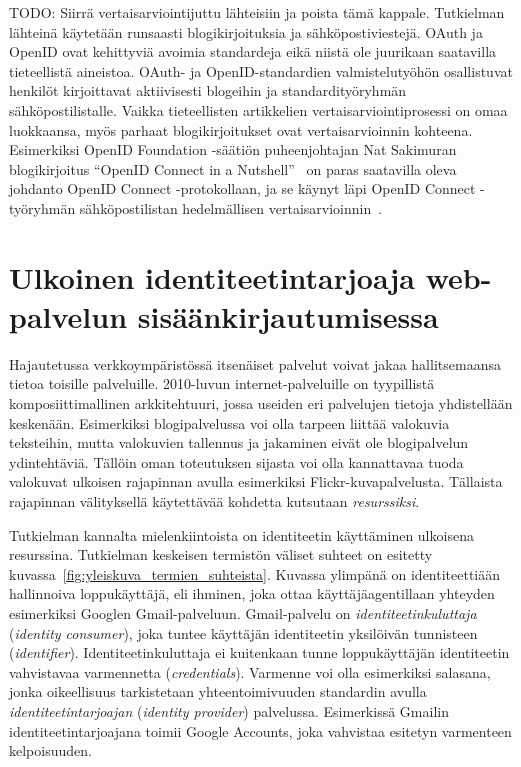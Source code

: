 \documentclass[finnish,gradu]{tktltiki}
\begin{document}
  TODO: Siirrä vertaisarviointijuttu lähteisiin ja poista tämä kappale.
  Tutkielman lähteinä käytetään runsaasti blogikirjoituksia ja sähköpostiviestejä. OAuth ja OpenID ovat kehittyviä avoimia standardeja eikä niistä ole juurikaan saatavilla tieteellistä aineistoa. OAuth- ja OpenID-standardien valmistelutyöhön osallistuvat henkilöt kirjoittavat aktiivisesti blogeihin ja standardityöryhmän sähköpostilistalle. Vaikka tieteellisten artikkelien vertaisarviointiprosessi on omaa luokkaansa, myös parhaat blogikirjoitukset ovat vertaisarvioinnin kohteena. Esimerkiksi OpenID Foundation -säätiön puheenjohtajan Nat Sakimuran blogikirjoitus ``OpenID Connect in a Nutshell''~\cite{sakimura_openid_c_nutshell_2012} on paras saatavilla oleva johdanto OpenID Connect -protokollaan, ja se käynyt läpi OpenID Connect -työryhmän sähköpostilistan hedelmällisen vertaisarvioinnin~\cite{openid_c_nutshell_peer_review_1_2012, openid_c_nutshell_peer_review_2_2012}.






\newpage
\section{Ulkoinen identiteetintarjoaja web-palvelun sisäänkirjautumisessa} %
\label{sec:kakkosluku}

  Hajautetussa verkkoympäristössä itsenäiset palvelut voivat jakaa hallitsemaansa tietoa toisille palveluille. 2010-luvun internet-palveluille on tyypillistä komposiittimallinen arkkitehtuuri, jossa useiden eri palvelujen tietoja yhdistellään keskenään. Esimerkiksi blogipalvelussa voi olla tarpeen liittää valokuvia teksteihin, mutta valokuvien tallennus ja jakaminen eivät ole blogipalvelun ydintehtäviä. Tällöin oman toteutuksen sijasta voi olla kannattavaa tuoda valokuvat ulkoisen rajapinnan avulla esimerkiksi Flickr-kuvapalvelusta. Tällaista rajapinnan välityksellä käytettävää kohdetta kutsutaan \emph{resurssiksi}.

  Tutkielman kannalta mielenkiintoista on identiteetin käyttäminen ulkoisena resurssina. Tutkielman keskeisen termistön väliset suhteet on esitetty kuvassa~\ref{fig:yleiskuva_termien_suhteista}. Kuvassa ylimpänä on identiteettiään hallinnoiva loppukäyttäjä, eli ihminen, joka ottaa käyttäjäagentillaan yhteyden esimerkiksi Googlen Gmail-palveluun. Gmail-palvelu on \emph{identiteetinkuluttaja} (\emph{identity consumer}), joka tuntee käyttäjän identiteetin yksilöivän tunnisteen (\emph{identifier}). Identiteetinkuluttaja ei kuitenkaan tunne loppukäyttäjän identiteetin vahvistavaa varmennetta (\emph{credentials}). Varmenne voi olla esimerkiksi salasana, jonka oikeellisuus tarkistetaan yhteentoimivuuden standardin avulla \emph{identiteetintarjoajan} (\emph{identity provider}) palvelussa. Esimerkissä Gmailin identiteetintarjoajana toimii Google Accounts, joka vahvistaa esitetyn varmenteen kelpoisuuden.
\end{document}
